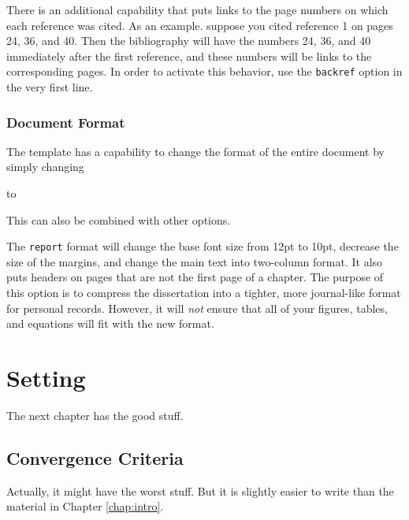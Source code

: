 \documentclass[thesis]{../cls/thesis-umich}
\begin{document}
There is an additional capability that puts links to the page numbers on
which each reference was cited.  As an example. suppose you cited
reference 1 on pages 24, 36, and 40.  Then the bibliography will have
the numbers 24, 36, and 40 immediately after the first reference, and
these numbers will be links to the corresponding pages.  In order to
activate this behavior, use the \verb|backref| option in the very first
line.



\subsection{Document Format}
The template has a capability to change the format of the entire
document by simply changing
to
This can also be combined with other options.
The \verb|report| format will change the base font size from 12pt to
10pt, decrease the size of the margins, and change the main text into
two-column format.  It also puts headers on pages that are not the first
page of a chapter.  The purpose of this option is to compress the
dissertation into a tighter, more journal-like format for personal
records.  However, it will \emph{not} ensure that all of your figures,
tables, and equations will fit with the new format.




\chapter{Setting}
The next chapter has the good stuff.

\section{Convergence Criteria}
Actually, it might have the worst stuff.  But it is slightly easier to
write than the material in Chapter \ref{chap:intro}.
\end{document}
